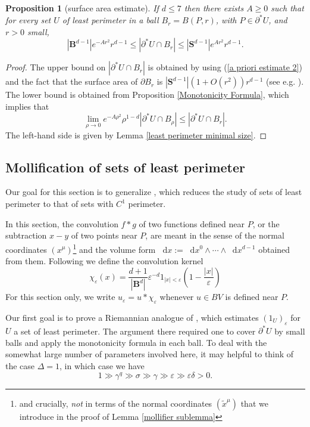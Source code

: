 \documentclass[reqno,10pt]{amsart}
\newcommand{\Sph}{\mathbf S}
\newcommand{\Ball}{\mathbf{B}}
\newcommand*\dif{\mathop{}\!\mathrm{d}}
\newtheorem{proposition}[theorem]{Proposition}
\theoremstyle{definition}
\numberwithin{equation}{section}
\begin{document}
\begin{proposition}[surface area estimate]\label{doubling dimension}
If $d \leq 7$ then there exists $A \geq 0$ such that for every set $U$ of least perimeter in a ball $B_r = B(P, r)$, with $P \in \partial^* U$, and $r > 0$ small,
$$|\Ball^{d - 1}|e^{-Ar^2}r^{d - 1} \leq |\partial^*U \cap B_r| \leq |\Sph^{d - 1}|e^{Ar^2} r^{d - 1}.$$
\end{proposition}
\begin{proof}
The upper bound on $|\partial^* U \cap B_r|$ is obtained by using (\ref{a priori estimate 2}) and the fact that the surface area of $\partial B_r$ is $|\Sph^{d - 1}|(1 + O(r^2))r^{d - 1}$ (see e.g. \cite{gray1974volume}).
The lower bound is obtained from Proposition \ref{Monotonicity Formula}, which implies that
$$\lim_{\rho \to 0} e^{-A\rho^2} \rho^{1 - d} |\partial^* U \cap B_\rho| \leq |\partial^* U \cap B_r|.$$
The left-hand side is given by Lemma \ref{least perimeter minimal size}.
\end{proof}

\subsection{Mollification of sets of least perimeter}
Our goal for this section is to generalize \cite[Lemma 7.5]{Giusti77}, which reduces the study of sets of least perimeter to that of sets with $C^1$ perimeter.

In this section, the convolution $f * g$ of two functions defined near $P$, or the subtraction $x - y$ of two points near $P$, are meant in the sense of the normal coordinates $(x^\mu)$\footnote{and crucially, \emph{not} in terms of the normal coordinates $(\tilde x^\mu)$ that we introduce in the proof of Lemma \ref{mollifier sublemma}} and the volume form $\dif x := \dif x^0 \wedge \cdots \wedge \dif x^{d - 1}$ obtained from them. Following \cite[Chapter 7]{Giusti77} we define the convolution kernel
$$\chi_\varepsilon(x) = \frac{d + 1}{|\Ball^d|} \varepsilon^{-d}1_{|x| < \varepsilon} \left(1 - \frac{|x|}{\varepsilon}\right)$$
For this section only, we write $u_\varepsilon = u * \chi_\varepsilon$ whenever $u \in BV$ is defined near $P$.

Our first goal is to prove a Riemannian analogue of \cite[Theorem 7.3]{Giusti77}, which estimates $(1_U)_\varepsilon$ for $U$ a set of least perimeter.
The argument there required one to cover $\partial^* U$ by small balls and apply the monotonicity formula in each ball.
To deal with the somewhat large number of parameters involved here, it may helpful to think of the case $\Delta = 1$, in which case we have
$$1 \gg \gamma^q \gg \sigma \gg \gamma \gg \varepsilon \gg \varepsilon \delta > 0.$$
\end{document}
